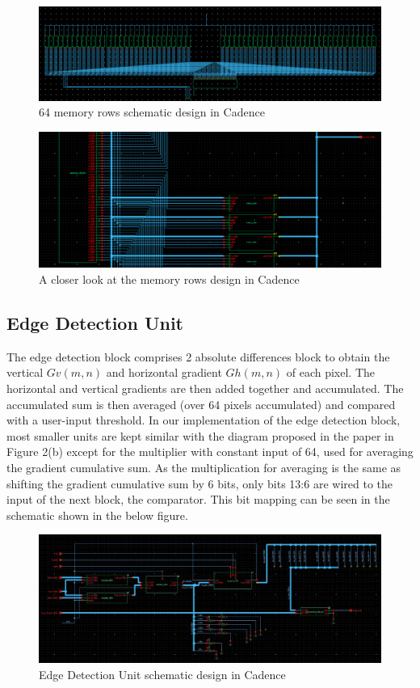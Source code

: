 \documentclass[letterpaper, 11pt]{article}
\begin{document}
	\begin{figure}[htb!]
		\centering
		\includegraphics[width=0.85\linewidth]{report_pics/mem_block_schem.png}
		\caption{64 memory rows schematic design in Cadence}
		\label{fig22}
	\end{figure}
	
	\begin{figure}[htb!]
		\centering
		\includegraphics[width=0.85\linewidth]{report_pics/mem_block_detailed.png}
		\caption{A closer look at the memory rows design in Cadence}
		\label{fig23}
	\end{figure}
	
	\subsection{Edge Detection Unit}
	\label{subsec:edge_detect}
	
	The edge detection block comprises 2 absolute differences block to obtain the vertical $Gv(m, n)$ and horizontal gradient $Gh(m, n)$ of each pixel. The horizontal and vertical gradients are then added together and accumulated. The accumulated sum is then averaged (over 64 pixels accumulated) and compared with a user-input threshold. In our implementation of the edge detection block, most smaller units are kept similar with the diagram proposed in the paper in Figure 2(b) except for the multiplier with constant input of 64, used for averaging the gradient cumulative sum. As the multiplication for averaging is the same as shifting the gradient cumulative sum by 6 bits, only bits 13:6 are wired to the input of the next block, the comparator. This bit mapping can be seen in the schematic shown in the below figure.
	
	\begin{figure}[htb!]
		\centering
		\includegraphics[width=0.85\linewidth]{report_pics/edge_detect_schem.jpg}
		\caption{Edge Detection Unit schematic design in Cadence}
		\label{fig24}
	\end{figure}
	
\end{document}
